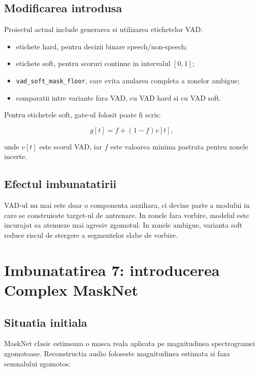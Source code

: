 \documentclass[12pt,a4paper]{article}
\begin{document}
\subsection{Modificarea introdusa}

Proiectul actual include generarea si utilizarea etichetelor VAD:

\begin{itemize}
    \item etichete hard, pentru decizii binare speech/non-speech;
    \item etichete soft, pentru scoruri continue in intervalul $[0,1]$;
    \item \texttt{vad\_soft\_mask\_floor}, care evita anularea completa a zonelor
    ambigue;
    \item comparatii intre variante fara VAD, cu VAD hard si cu VAD soft.
\end{itemize}

Pentru etichetele soft, gate-ul folosit poate fi scris:

\begin{equation}
    g[t] = f + (1-f)v[t],
\end{equation}

unde $v[t]$ este scorul VAD, iar $f$ este valoarea minima pastrata pentru zonele
incerte.

\subsection{Efectul imbunatatirii}

VAD-ul nu mai este doar o componenta auxiliara, ci devine parte a modului in care
se construieste target-ul de antrenare. In zonele fara vorbire, modelul este
incurajat sa atenueze mai agresiv zgomotul. In zonele ambigue, varianta soft
reduce riscul de stergere a segmentelor slabe de vorbire.

\section{Imbunatatirea 7: introducerea Complex MaskNet}

\subsection{Situatia initiala}

MaskNet clasic estimeaza o masca reala aplicata pe magnitudinea spectrogramei
zgomotoase. Reconstructia audio foloseste magnitudinea estimata si faza semnalului
zgomotos:
\end{document}
